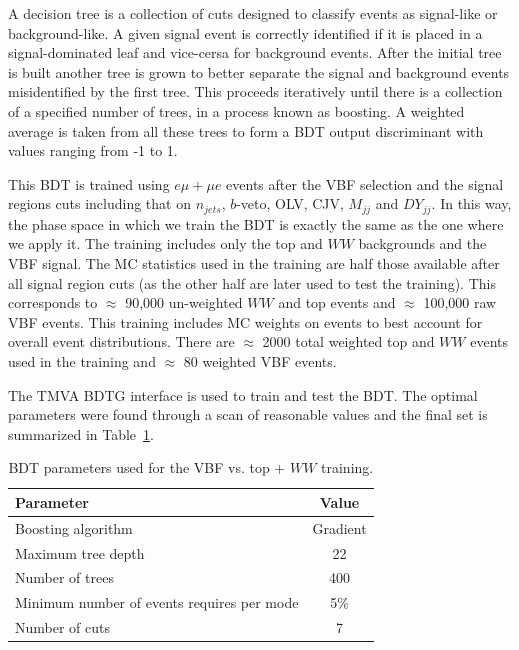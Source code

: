 A decision tree is a collection of cuts designed to classify events as signal-like or background-like. A given signal event is correctly identified if it is placed in a signal-dominated leaf and vice-cersa for background events. After the initial tree is built another tree is grown to better separate the signal and background events misidentified by the first tree. This proceeds iteratively until there is a collection of a specified number of trees, in a process known as boosting. A weighted average is taken from all these trees to form a BDT output discriminant with values ranging from -1 to 1.

This BDT is trained using $e\mu+\mu e$ events after the VBF selection and the signal regions cuts including that on $n_{jets}$, $b$-veto, OLV, CJV, $M_{jj}$ and $DY_{jj}$. In this way, the phase space in which we train the BDT is exactly the same as the one where we apply it. The training includes only the top and $WW$ backgrounds and the VBF signal. The MC statistics used in the training are half those available after all signal region cuts (as the other half are later used to test the training). This corresponds to $\approx$ 90,000 un-weighted $WW$ and top events and $\approx$ 100,000 raw VBF events. This training includes MC weights on events to best account for overall event distributions. There are $\approx$ 2000 total weighted top and $WW$ events used in the training and $\approx$ 80 weighted VBF events. 

The TMVA BDTG interface is used to train and test the BDT. The optimal parameters were found through a scan of reasonable values and the final set is summarized in Table~\ref{tab:SRBDTparameters}.
\begin{table}[h!]
\centering
\begin{tabular}{|l|c|}
\hline
Parameter                                    & Value     \\
\hline
Boosting algorithm                           &  Gradient  \\
Maximum tree depth                           &  22       \\
Number of trees                              &  400     \\
Minimum number of events requires per mode   &  5\%      \\
Number of cuts                               &  7        \\
\hline
\end{tabular}
\caption{BDT parameters used for the VBF vs. top + $WW$ training.} 
\label{tab:SRBDTparameters}
\end{table}

